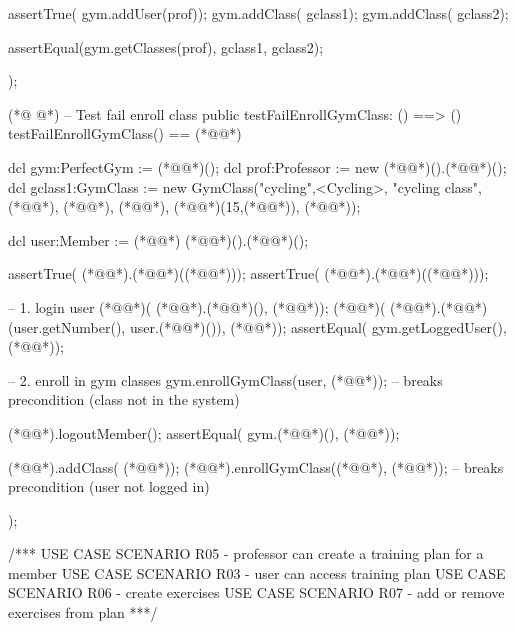 \begin{vdmpp}[breaklines=true]
  assertTrue( gym.addUser(prof));
  gym.addClass( gclass1); 
  gym.addClass( gclass2);
  
  assertEqual(gym.getClasses(prof), {gclass1, gclass2});
  
 );
 
(*@
\label{testFailEnrollGymClass:364}
@*)
 -- Test fail enroll class
 public testFailEnrollGymClass: () ==> ()
 testFailEnrollGymClass() == (*@\vdmnotcovered{(}@*)
  
  dcl gym:PerfectGym := (*@@*)();
  dcl prof:Professor := new (*@@*)().(*@@*)();
  dcl gclass1:GymClass := new GymClass("cycling",<Cycling>, "cycling class", (*@@*), (*@@*), (*@@*), (*@@*)(15,(*@@*)), (*@@*));
 
  dcl user:Member := (*@@*) (*@@*)().(*@@*)(); 
  
  assertTrue( (*@@*).(*@@*)((*@@*)));
  assertTrue( (*@@*).(*@@*)((*@@*)));
  
  -- 1. login user
  (*@@*)( (*@@*).(*@@*)(), (*@@*)); 
  (*@@*)( (*@@*).(*@@*)(user.getNumber(), user.(*@@*)()), (*@@*));
  assertEqual( gym.getLoggedUser(), (*@@*));
  
  -- 2. enroll in gym classes
  gym.enrollGymClass(user, (*@@*));    -- breaks precondition (class not in the system)
    
   (*@@*).logoutMember();
   assertEqual( gym.(*@@*)(), (*@@*)); 
   
   (*@@*).addClass( (*@@*)); 
   (*@@*).enrollGymClass((*@@*), (*@@*));    -- breaks precondition (user not logged in)
      
 );
 
 
 
 /*** USE CASE SCENARIO R05 - professor can create a training plan for a member      
    USE CASE SCENARIO R03 - user can access training plan
       USE CASE SCENARIO R06 - create exercises
       USE CASE SCENARIO R07 - add or remove exercises from plan ***/
 

\end{vdmpp}
